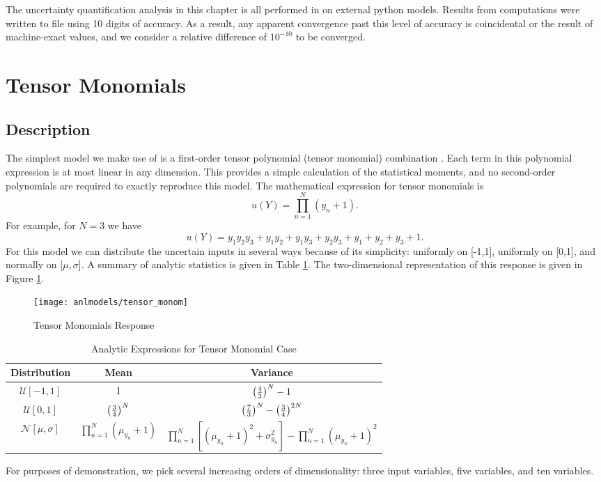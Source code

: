 The uncertainty quantification analysis in this chapter is all performed in \raven{} \cite{raven} on external python
models.  Results from \raven{} computations were written to file using 10 digits of accuracy.
As a result, any apparent convergence past this level of accuracy is coincidental or the result of
machine-exact values, and we consider a relative difference of $10^{-10}$ to be converged.




\section{Tensor Monomials}
\subsection{Description}\label{mod:tensor monom}
The simplest model we make use of is a first-order tensor polynomial (tensor monomial) combination \cite{Ayres}.
Each term in this polynomial expression is at most linear in any dimension.  This provides a simple calculation
of the statistical moments, and no second-order polynomials are required to exactly reproduce this model.
The mathematical expression for tensor monomials is
\begin{equation}
  u(Y) = \prod_{n=1}^N (y_n+1).
\end{equation}
For example, for $N=3$ we have
\begin{equation}
  u(Y) = y_1y_2y_3 + y_1y_2 + y_1y_3 + y_2y_3 + y_1 + y_2 + y_3 + 1.
\end{equation}
For this model we can distribute the uncertain inputs in several ways because of its simplicity: uniformly on [-1,1], uniformly on
[0,1], and normally on [$\mu,\sigma$]. A summary of analytic statistics is given in Table \ref{tab:tensormono moments}.
The two-dimensional representation of this response is given in Figure \ref{fig: tensor monomials}.
\begin{figure}[htb]
  \centering
  \texttt{[image: anlmodels/tensor\_monom]}
  \caption{Tensor Monomials Response}
  \label{fig: tensor monomials}
\end{figure}

\begin{table}[H]
  \centering
  \begin{tabular}{c|c|c}
    Distribution & Mean & Variance \\\hline
    $\mathcal{U}[-1,1]$ & 1 & $\qty(\frac{4}{3})^N - 1$ \\
    $\mathcal{U}[0,1]$ & $\qty(\frac{3}{4})^N$ & $\qty(\frac{7}{3})^N - \qty(\frac{3}{4})^{2N}$ \\
    $\mathcal{N}[\mu,\sigma]$ & $\prod_{n=1}^N (\mu_{y_n}+1)$ & $\prod_{n=1}^N[(\mu_{y_n}+1)^2+\sigma_{y_n}^2]
    - \prod_{n=1}^N (\mu_{y_n}+1)^2$
  \end{tabular}
  \caption{Analytic Expressions for Tensor Monomial Case}
  \label{tab:tensormono moments}
\end{table}
For purposes of demonstration, we pick several increasing orders of dimensionality: three input variables, five variables, and
ten variables.

